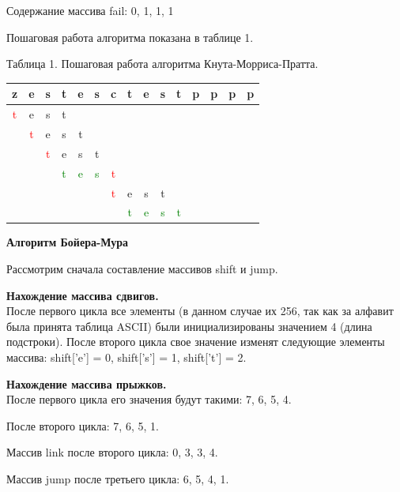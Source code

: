 \documentclass[a4paper, 14pt]{article}
\begin{document}
        Содержание массива fail: {0, 1, 1, 1}
        
        Пошаговая работа алгоритма показана в таблице 1.
	
		\begin{center}
	Таблица 1. Пошаговая работа алгоритма Кнута-Морриса-Пратта.\\

	\begin{tabular}{| c | c | c | c | c | c | c | c | c | c | c | c | c | c | c | }
	\hline
	z&e&s&t&e&s&c&t&e&s&t&p&p&p&p \\
	\hline
	\textcolor{red}{t}&e&s&t&&&&&&&&&&& \\
	&\textcolor{red}{t}&e&s&t&&&&&&&&&& \\
	&&\textcolor{red}{t}&e&s&t&&&&&&&&& \\
	&&&\textcolor{green}{t}&\textcolor{green}{e}&\textcolor{green}{s}&\textcolor{red}{t}&&&&&&&& \\
	&&&&&&\textcolor{red}{t}&e&s&t&&&&& \\
	&&&&&&&\textcolor{green}{t}&\textcolor{green}{e}&\textcolor{green}{s}&\textcolor{green}{t}&&&& \\
	\hline

	
	\end{tabular}
		\end{center}
		
				\begin{center}
				\textbf{Алгоритм Бойера-Мура}
		\end{center}
		
		Рассмотрим сначала составление массивов shift и jump.
		
		\textbf{Нахождение массива сдвигов.}	\\	
		
		После первого цикла все элементы (в данном случае их 256, так как за алфавит была принята таблица ASCII) были инициализированы значением 4 (длина подстроки).
		После второго цикла свое значение изменят следующие элементы массива: shift['e'] = 0, shift['s'] = 1, shift['t'] = 2.
		
		\textbf{Нахождение массива прыжков.}\\
		
		После первого цикла его значения будут такими: 7, 6, 5, 4.
		
		После второго цикла: 7, 6, 5, 1.
		
		Массив link после второго цикла: 0, 3, 3, 4.
		
		Массив jump после третьего цикла: 6, 5, 4, 1.
		
\end{document}
